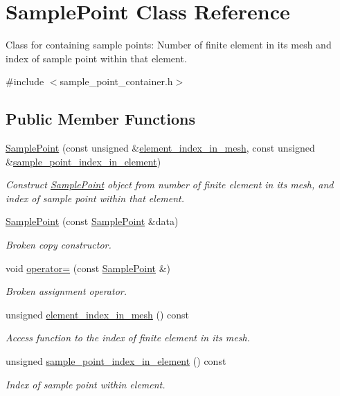 \hypertarget{classSamplePoint}{}\section{Sample\+Point Class Reference}
\label{classSamplePoint}


Class for containing sample points\+: Number of finite element in its mesh and index of sample point within that element.  




{\ttfamily \#include $<$sample\+\_\+point\+\_\+container.\+h$>$}

\subsection*{Public Member Functions}
\begin{DoxyCompactItemize}
\item 
\hyperlink{classSamplePoint_a19d7c1b8e810ea533765acabcea312b5}{Sample\+Point} (const unsigned \&\hyperlink{classSamplePoint_a57f59cddbb9ef2e3100588cf2eacba5c}{element\+\_\+index\+\_\+in\+\_\+mesh}, const unsigned \&\hyperlink{classSamplePoint_ad0d3ebd068a502dcd4d2940449560fb0}{sample\+\_\+point\+\_\+index\+\_\+in\+\_\+element})
\begin{DoxyCompactList}\small\item\em Construct \hyperlink{classSamplePoint}{Sample\+Point} object from number of finite element in its mesh, and index of sample point within that element. \end{DoxyCompactList}\item 
\hyperlink{classSamplePoint_a69b61d9a3a217af33a58a703a295d1da}{Sample\+Point} (const \hyperlink{classSamplePoint}{Sample\+Point} \&data)
\begin{DoxyCompactList}\small\item\em Broken copy constructor. \end{DoxyCompactList}\item 
void \hyperlink{classSamplePoint_aa91f365695d1f4567723770d880e60b2}{operator=} (const \hyperlink{classSamplePoint}{Sample\+Point} \&)
\begin{DoxyCompactList}\small\item\em Broken assignment operator. \end{DoxyCompactList}\item 
unsigned \hyperlink{classSamplePoint_a57f59cddbb9ef2e3100588cf2eacba5c}{element\+\_\+index\+\_\+in\+\_\+mesh} () const
\begin{DoxyCompactList}\small\item\em Access function to the index of finite element in its mesh. \end{DoxyCompactList}\item 
unsigned \hyperlink{classSamplePoint_ad0d3ebd068a502dcd4d2940449560fb0}{sample\+\_\+point\+\_\+index\+\_\+in\+\_\+element} () const
\begin{DoxyCompactList}\small\item\em Index of sample point within element. \end{DoxyCompactList}\end{DoxyCompactItemize}
